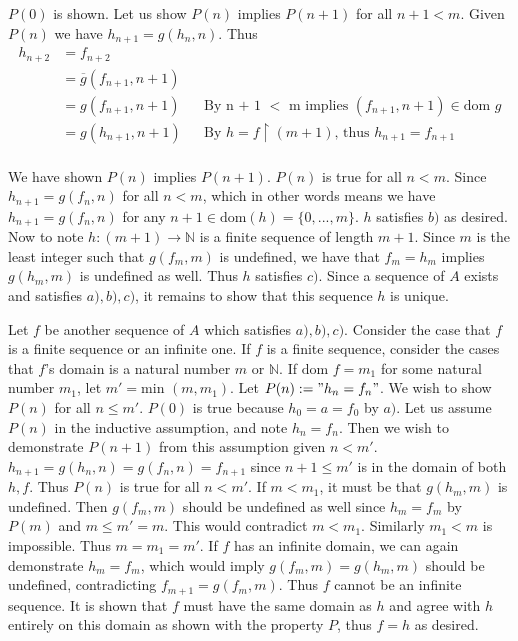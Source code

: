 \documentclass{article}
\begin{document}
\begin{enumerate}
	 	$P(0)$ is shown. Let us show $P(n)$ implies $P(n + 1)$ for all $n + 1 < m$. Given $P(n)$ we have $h_{n + 1} = g(h_n, n)$. Thus 
		\begin{align*}
			h_{n + 2} &= f_{n + 2}\\
			&= \overline{g}(f_{n + 1}, n + 1)\\
			&= g(f_{n + 1}, n + 1)  && \text{By n + 1 $<$ m implies $(f_{n + 1}, n + 1) \in \text{dom } g$}\\
			&= g(h_{n + 1}, n + 1) && \text{By $h = f \upharpoonright (m + 1)$, thus $h_{n + 1} = f_{n + 1}$}\\
		\end{align*}
		
		We have shown $P(n)$ implies $P(n + 1)$. $P(n)$ is true for all $n < m$. Since $h_{n + 1} = g(f_n, n)$ for all $n < m$, which in other words means we have $h_{n + 1} = g(f_n, n)$ for any $n + 1 \in \text{dom}(h) = \{0,...,m\}$. $h$ satisfies $b)$ as desired. Now to note $h: (m + 1) \xrightarrow{} \mathbb{N}$ is a finite sequence of length $m + 1$. Since $m$ is the least integer such that $g(f_m, m)$ is undefined, we have that $f_m = h_m$ implies $g(h_m, m)$ is undefined as well. Thus $h$ satisfies $c)$. Since a sequence of $A$ exists and satisfies $a),b),c)$, it remains to show that this sequence $h$ is unique.
		
		\medskip
		 Let $f$ be another sequence of $A$ which satisfies $a),b),c)$. Consider the case that $f$ is a finite sequence or an infinite one. If $f$ is a finite sequence, consider the cases that $f$'s domain is a natural number $m$ or $\mathbb{N}$. If $\text{dom } f = m_1$ for some natural number $m_1$, let $m' = \text{min }(m, m_1)$.  Let $P(n) := "h_n = f_n"$. We wish to show $P(n)$ for all $n \leq m'$. $P(0)$ is true because $h_0 = a = f_0$ by $a)$. Let us assume $P(n)$ in the inductive assumption, and note $h_n = f_n$. Then we wish to demonstrate $P(n + 1)$ from this assumption given $n < m'$. $h_{n + 1} = g(h_n, n) = g(f_n, n) = f_{n + 1}$ since $n + 1 \leq m'$ is in the domain of both $h,f$. Thus $P(n)$ is true for all $n < m'$. If $m < m_1$, it must be that $g(h_m, m)$ is undefined. Then $g(f_m, m)$ should be undefined as well since $h_m = f_m$ by $P(m)$ and $m \leq m' = m$. This would contradict $m < m_1$. Similarly $m_1 < m$ is impossible. Thus $m = m_1 = m'$. If $f$ has an infinite domain, we can again demonstrate $h_m = f_m$, which would imply $g(f_m,m) = g(h_m,m)$ should be undefined, contradicting $f_{m + 1} = g(f_m, m)$. Thus $f$ cannot be an infinite sequence. It is shown that $f$ must have the same domain as $h$ and agree with $h$ entirely on this domain as shown with the property $P$, thus $f = h$ as desired.
		 

\end{enumerate}
\end{document}
